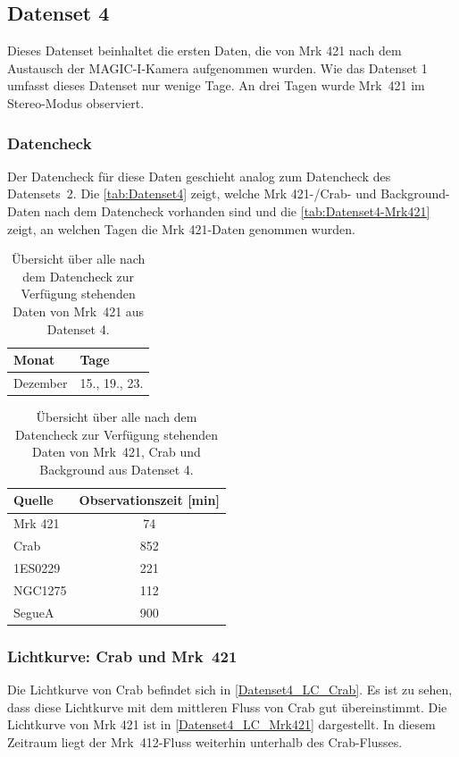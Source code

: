 \FloatBarrier

\subsection{Datenset 4}
\label{subsec:Datenset_4}
Dieses Datenset beinhaltet die ersten Daten, die von Mrk 421 nach dem Austausch der MAGIC-I-Kamera aufgenommen wurden. 
Wie das Datenset 1 umfasst dieses Datenset nur wenige Tage. 
An drei Tagen wurde Mrk~421 im Stereo-Modus observiert. 

\subsubsection{Datencheck}
Der Datencheck für diese Daten geschieht analog zum Datencheck des Datensets~2. 
Die \autoref{tab:Datenset4} zeigt, welche Mrk 421-/Crab- und Background-Daten nach dem Datencheck vorhanden sind und die \autoref{tab:Datenset4-Mrk421} zeigt, an welchen Tagen die Mrk 421-Daten genommen wurden.

\begin{table}[!h]
\centering
\caption{Übersicht über alle nach dem Datencheck zur Verfügung stehenden Daten von Mrk~421 aus Datenset 4.}
\label{tab:Datenset4-Mrk421}
\begin{tabular}{ll}
  \toprule
  Monat & Tage\\
  \midrule
  \midrule
Dezember & 15., 19., 23.\\
  \bottomrule
\end{tabular}
\end{table}


\begin{table}[!h]
\centering
\caption{Übersicht über alle nach dem Datencheck zur Verfügung stehenden Daten von Mrk~421, Crab und Background aus Datenset 4.}
\label{tab:Datenset4}
\begin{tabular}{lc}
  \toprule
  Quelle & Observationszeit [min]\\
  \midrule
  \midrule
  Mrk 421 & 74\\
  \midrule
  Crab & 852\\
  \midrule
  1ES0229 & 221 \\
  NGC1275 & 112 \\
  SegueA & 900  \\
  \bottomrule
\end{tabular}
\end{table}

\subsubsection{Lichtkurve: Crab und Mrk~421}
Die Lichtkurve von Crab befindet sich in \autoref{Datenset4_LC_Crab}. 
Es ist zu sehen, dass diese Lichtkurve mit dem mittleren Fluss von Crab gut übereinstimmt.
Die Lichtkurve von Mrk 421 ist in \autoref{Datenset4_LC_Mrk421} dargestellt. 
In diesem Zeitraum liegt der Mrk~412-Fluss weiterhin unterhalb des Crab-Flusses.

